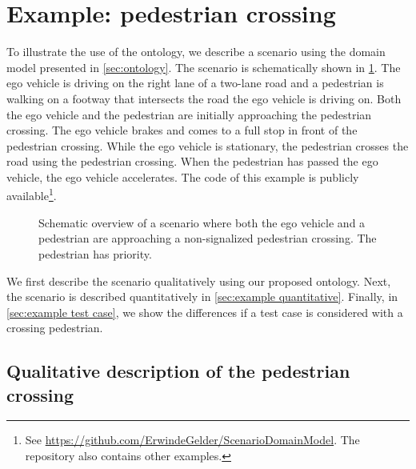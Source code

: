 \section{Example: pedestrian crossing}
\label{sec:example}

To illustrate the use of the ontology, we describe a scenario using the domain model presented in \cref{sec:ontology}. The scenario is schematically shown in \cref{fig:scenario overview}. The ego vehicle is driving on the right lane of a two-lane road and a pedestrian is walking on a footway that intersects the road the ego vehicle is driving on. Both the ego vehicle and the pedestrian are initially approaching the pedestrian crossing. The ego vehicle brakes and comes to a full stop in front of the pedestrian crossing. While the ego vehicle is stationary, the pedestrian crosses the road using the pedestrian crossing. When the pedestrian has passed the ego vehicle, the ego vehicle accelerates. \cstart The code of this example is publicly available\footnote{\cstart See \url{https://github.com/ErwindeGelder/ScenarioDomainModel}. The repository also contains other examples.\cend}\cend.

\setlength{\figurewidth}{0.4\linewidth}
\begin{figure}
	\centering
	
	\caption{Schematic overview of a scenario where both the ego vehicle and a pedestrian are approaching a non-signalized pedestrian crossing. The pedestrian has priority. 
	}
	\label{fig:scenario overview}
\end{figure}



We first describe the scenario qualitatively using our proposed ontology. Next, the scenario is described quantitatively in \cref{sec:example quantitative}. Finally, in \cref{sec:example test case}, we show the differences if a test case is considered with a crossing pedestrian.



\subsection{Qualitative description of the pedestrian crossing}
\label{sec:example qualitative}

